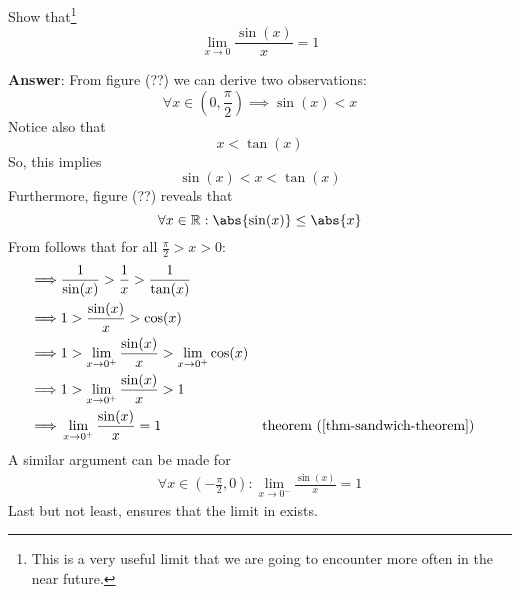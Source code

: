 \begin{exm}\label{exm-important-sin-over-x-limit}
	Show that\footnote{This is a very useful limit that we are going to encounter
		more often in the near future.}
	\begin{equation}\label{eq-important-sin-over-x-limit}
		\lim_{x \to 0}\frac{\sin(x)}{x}=1
	\end{equation}
	\begin{flushleft}
		\textbf{Answer}: From figure (??) we can derive two observations:
		\begin{equation*}
			\forall x\in\left(0,\frac{\pi}{2}\right)\implies \sin(x)<x
		\end{equation*}
		Notice also that
		\begin{equation*}
			x < \tan(x)
		\end{equation*}
		So, this implies
		\begin{equation}\label{eq-important-sin-over-x-limit:1}
			\sin(x) < x < \tan(x)
		\end{equation}
		Furthermore, figure (??) reveals that
		\begin{equation*}
			\forall x\in\mathbb{R}:\abs{\sin(x)}\leq\abs{x}
		\end{equation*}
		From  follows that for all
		$\tfrac{\pi}{2}>x>0$:
		\begin{align*}
			\implies
			 & \frac{1}{\sin(x)} > \frac{1}{x} > \frac{1}{\tan(x)}                                                              \\
			\implies
			 & 1 > \frac{\sin(x)}{x} > \cos(x)                                                                                  \\
			\implies
			 & 1 > \lim_{x \to 0^+}\frac{\sin(x)}{x} > \lim_{x \to 0^+}\cos(x)                                                  \\
			\implies
			 & 1 > \lim_{x \to 0^+}\frac{\sin(x)}{x} > 1                                                                        \\
			\implies
			 & \lim_{x \to 0^+}\frac{\sin(x)}{x}=1                             &  & \text{theorem (\ref{thm-sandwich-theorem})}
		\end{align*}
		A similar argument can be made for
		\begin{align*}
			\forall x\in\left(-\frac{\pi}{2},0\right):\lim_{x \to 0^-}\frac{\sin(x)}{x}=1
		\end{align*}
		Last but not least,  ensures
		that the limit in  exists.
	\end{flushleft}
\end{exm}

